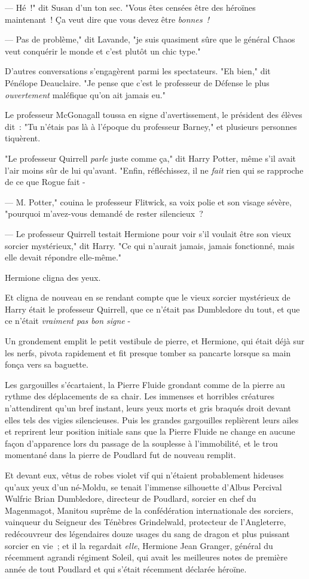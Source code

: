 --- Hé~!" dit Susan d'un ton sec. "Vous êtes censées être des héroïnes maintenant~! Ça veut dire que vous devez être \emph{bonnes~!}

--- Pas de problème," dit Lavande, "je suis quasiment sûre que le général Chaos veut conquérir le monde et c'est plutôt un chic type."

D'autres conversations s'engagèrent parmi les spectateurs. "Eh bien," dit Pénélope Deauclaire. "Je pense que c'est le professeur de Défense le plus \emph{ouvertement} maléfique qu'on ait jamais eu."

Le professeur McGonagall toussa en signe d'avertissement, le président des élèves dit~: "Tu n'étais pas là à l'époque du professeur Barney," et plusieurs personnes tiquèrent.

"Le professeur Quirrell \emph{parle} juste comme ça," dit Harry Potter, même s'il avait l'air moins sûr de lui qu'avant. "Enfin, réfléchissez, il ne \emph{fait} rien qui se rapproche de ce que Rogue fait -

--- M. Potter," couina le professeur Flitwick, sa voix polie et son visage sévère, "pourquoi m'avez-vous demandé de rester silencieux~?

--- Le professeur Quirrell testait Hermione pour voir s'il voulait être son vieux sorcier mystérieux," dit Harry. "Ce qui n'aurait jamais, jamais fonctionné, mais elle devait répondre elle-même."

Hermione cligna des yeux.

Et cligna de nouveau en se rendant compte que le vieux sorcier mystérieux de Harry était le professeur Quirrell, que ce n'était pas Dumbledore du tout, et que ce n'était \emph{vraiment pas bon signe} -

Un grondement emplit le petit vestibule de pierre, et Hermione, qui était déjà sur les nerfs, pivota rapidement et fit presque tomber sa pancarte lorsque sa main fonça vers sa baguette.

Les gargouilles s'écartaient, la Pierre Fluide grondant comme de la pierre au rythme des déplacements de sa chair. Les immenses et horribles créatures n'attendirent qu'un bref instant, leurs yeux morts et gris braqués droit devant elles tels des vigies silencieuses. Puis les grandes gargouilles replièrent leurs ailes et reprirent leur position initiale sans que la Pierre Fluide ne change en aucune façon d'apparence lors du passage de la souplesse à l'immobilité, et le trou momentané dans la pierre de Poudlard fut de nouveau remplit.

Et devant eux, vêtus de robes violet vif qui n'étaient probablement hideuses qu'aux yeux d'un né-Moldu, se tenait l'immense silhouette d'Albus Percival Wulfric Brian Dumbledore, directeur de Poudlard, sorcier en chef du Magenmagot, Manitou suprême de la confédération internationale des sorciers, vainqueur du Seigneur des Ténèbres Grindelwald, protecteur de l'Angleterre, redécouvreur des légendaires douze usages du sang de dragon et plus puissant sorcier en vie~; et il la regardait \emph{elle}, Hermione Jean Granger, général du récemment agrandi régiment Soleil, qui avait les meilleures notes de première année de tout Poudlard et qui s'était récemment déclarée héroïne.

